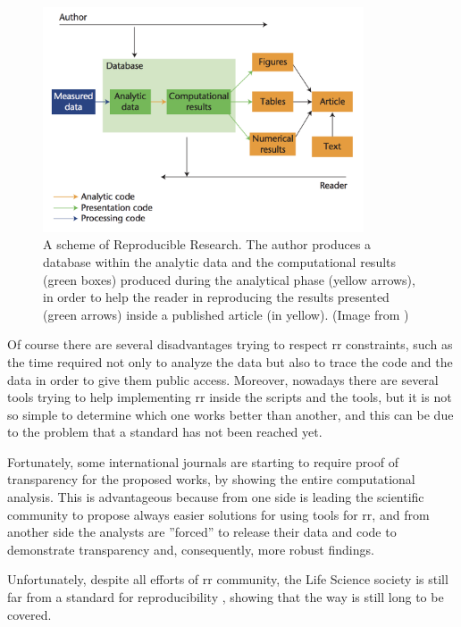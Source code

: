 \begin{figure}[H]
\centering
\includegraphics[width=9.5cm, keepaspectratio]{img/intro/rr_scheme.png}
\caption[RR generic scheme]{A scheme of Reproducible Research. 
The author produces a database within the analytic data and the computational results (green boxes) produced during the analytical phase (yellow arrows), in order to help the reader in reproducing the results presented (green arrows) inside a published article (in yellow). (Image from \cite{Peng2009})}
\label{fig:introrr}
\end{figure}

Of course there are several disadvantages trying to respect \gls{rr} constraints, such as the time required not only to analyze the data but also to trace the code and the data in order to give them public access. 
Moreover, nowadays there are several tools  \cite{Aranguren2015, Goecks2010a, Gentleman2004, Shepherd2018}  trying to help implementing \gls{rr} inside the scripts and the tools, but it is not so simple to determine which one works better than another, and this can be due to the problem that a standard has not been reached yet.

Fortunately, some international journals are starting to require proof of transparency for the proposed works, by showing the entire computational analysis.
This is advantageous because from one side is leading the scientific community to propose always easier solutions for using tools for \gls{rr}, and from another side the analysts are ''forced'' to release their data and code to demonstrate transparency and, consequently, more robust findings.

Unfortunately, despite all efforts of \gls{rr} community, the Life Science society is still far from a standard for reproducibility \cite{Iqbal2016}, showing that the way is still long to be covered.


